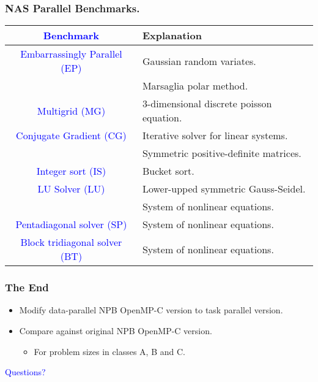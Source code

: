 \documentclass{beamer}
\newcommand{\tablefont}{\fontsize{8}{13}\selectfont}
\begin{document}
\begin{frame}[fragile]
\frametitle{NAS Parallel Benchmarks.}
\tablefont
\begin{tabular}{|c|l|}
\hline
\textcolor{blue}{Benchmark} & Explanation  \\
\hline
\textcolor{blue}{Embarrassingly Parallel (EP)} & Gaussian random variates. \\
                                               & Marsaglia polar method. \\
\hline
\textcolor{blue}{Multigrid (MG)} & 3-dimensional discrete poisson equation. \\
\hline
\textcolor{blue}{Conjugate Gradient (CG)} & Iterative solver for linear systems. \\
                                          & Symmetric positive-definite matrices. \\
\hline
\textcolor{blue}{Integer sort (IS)} & Bucket sort.\\
\hline
\textcolor{blue}{LU Solver (LU)} & Lower-upped symmetric Gauss-Seidel. \\
                                 & System of nonlinear equations. \\
\hline
\textcolor{blue}{Pentadiagonal solver (SP)} & System of nonlinear equations. \\
\hline
\textcolor{blue}{Block tridiagonal solver (BT)} & System of nonlinear equations. \\
\hline
\end{tabular}
\normalsize
\end{frame}

\begin{frame}
\frametitle{The End}
  \begin{itemize}
  \item Modify data-parallel NPB OpenMP-C version to task parallel version.
  \item Compare against original NPB OpenMP-C version.
    \begin{itemize}
    \item For problem sizes in classes A, B and C.
    \end{itemize}
  \end{itemize}
\begin{center}
\textcolor{blue}{Questions?}
\end{center}
\end{frame}
\end{document}
